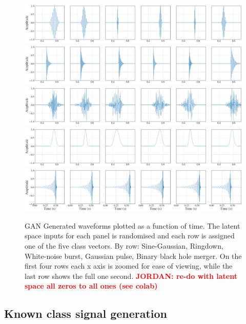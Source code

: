 \documentclass[12pt]{iopart}
\newcommand{\jordan}[1]{\textbf{\textcolor{red}{JORDAN: #1}}}
\begin{document}
\begin{figure}
    \centering
    \includegraphics[width=\textwidth]{figures/generations/sg.png}
    \includegraphics[width=\textwidth]{figures/generations/rd.png}
    \includegraphics[width=\textwidth]{figures/generations/wnb.png}
    \includegraphics[width=\textwidth]{figures/generations/blip.png}
    \includegraphics[width=\textwidth]{figures/generations/bbh.png}
    \caption{\ac{GAN} Generated waveforms plotted as a function of time. The latent space inputs for each panel is randomised and each row is assigned one of the five class vectors. By row: Sine-Gaussian, Ringdown,
White-noise burst, Gaussian pulse, Binary black hole merger. On the first four rows each x axis is zoomed for ease of viewing, while the last row shows the full one second. \jordan{re-do with latent space all zeros to all ones (see colab)}}
\label{fig:gen_signals} 
\end{figure}

\subsection{Known class signal generation}
\end{document}
